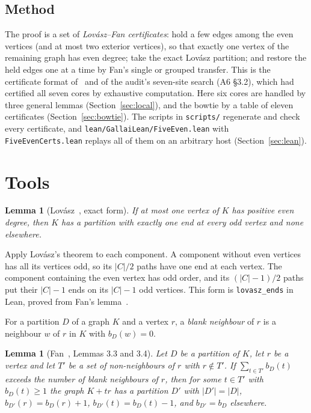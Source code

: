 \documentclass[11pt]{amsart}
\newtheorem{lemma}[theorem]{Lemma}
\theoremstyle{definition}
\begin{document}
\subsection*{Method}
The proof is a set of \emph{Lov\'asz--Fan certificates}: hold a few edges among the even vertices
(and at most two exterior vertices), so that exactly one vertex of the remaining graph has even
degree; take the exact Lov\'asz partition; and restore the held edges one at a time by Fan's single
or grouped transfer. This is the certificate format of~\cite{ES} and of the audit's seven-site search
(A6 \S3.2), which had certified all seven cores by exhaustive computation. Here six cores are
handled by three general lemmas (Section~\ref{sec:local}), and the bowtie by a table of eleven
certificates (Section~\ref{sec:bowtie}). The scripts in \texttt{scripts/} regenerate and check every
certificate, and \texttt{lean/GallaiLean/FiveEven.lean} with \texttt{FiveEvenCerts.lean} replays
all of them on an arbitrary host (Section~\ref{sec:lean}).

\section{Tools}\label{sec:tools}

\begin{lemma}[Lov\'asz~\cite{L68}, exact form]\label{lem:lovasz}
If at most one vertex of $K$ has positive even degree, then $K$ has a partition with exactly one end
at every odd vertex and none elsewhere.
\end{lemma}

Apply Lov\'asz's theorem to each component. A component without even vertices has all its vertices
odd, so its $|C|/2$ paths have one end at each vertex. The component containing the even vertex has
odd order, and its $(|C|-1)/2$ paths put their $|C|-1$ ends on its $|C|-1$ odd vertices. This form
is \texttt{lovasz\_ends} in Lean, proved from Fan's lemma~\cite{LF}.

For a partition $D$ of a graph $K$ and a vertex $r$, a \emph{blank neighbour} of $r$ is a neighbour
$w$ of $r$ in $K$ with $b_D(w)=0$.

\begin{lemma}[Fan~\cite{Fan}, Lemmas 3.3 and 3.4]\label{lem:fan}
Let $D$ be a partition of $K$, let $r$ be a vertex and let $T'$ be a set of non-neighbours of $r$
with $r\notin T'$. If $\sum_{t\in T'}b_D(t)$ exceeds the number of blank neighbours of $r$, then for
some $t\in T'$ with $b_D(t)\ge1$ the graph $K+tr$ has a partition $D'$ with $|D'|=|D|$,
$b_{D'}(r)=b_D(r)+1$, $b_{D'}(t)=b_D(t)-1$, and $b_{D'}=b_D$ elsewhere.
\end{lemma}
\end{document}
